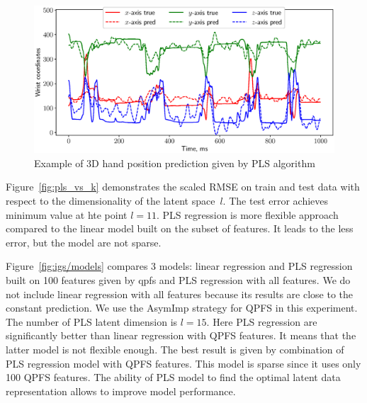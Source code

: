 \documentclass[12pt,oneside]{article}
\theoremstyle{definition}
\begin{document}
\begin{figure}
	\centering
	\includegraphics[width=\linewidth]{figs/ecog_prediction}
	\caption{Example of 3D hand position prediction given by PLS algorithm}
	\label{fig:ecog_prediction}
\end{figure}

Figure~\ref{fig:pls_vs_k} demonstrates the scaled RMSE on train and test data with respect to the dimensionality of the latent space~$l$.
The test error achieves minimum value at hte point $l = 11$.
PLS regression is more flexible approach compared to the linear model built on the subset of features.
It leads to the less error, but the model are not sparse.

Figure~\ref{fig:igs/models} compares 3 models: linear regression and PLS regression built on 100 features given by qpfs and PLS regression with all features.
We do not include linear regression with all features because its results are close to the constant prediction.
We use the AsymImp strategy for QPFS in this experiment.
The number of PLS latent dimension is $l = 15$.
Here PLS regression are significantly better than linear regression with QPFS features.
It means that the latter model is not flexible enough.
The best result is given by combination of PLS regression model with QPFS features. 
This model is sparse since it uses only 100 QPFS features.
The ability of PLS model to find the optimal latent data representation allows to improve model performance. 
\end{document}
